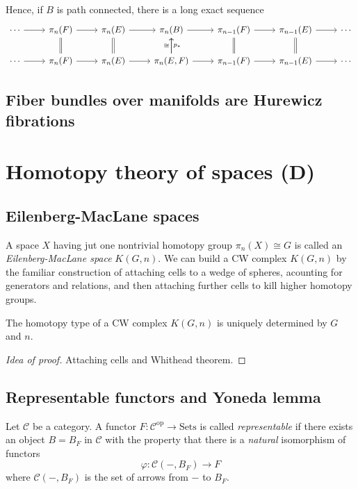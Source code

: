 \begin{definition}
\begin{theorem}[Hatcher 4.41]
	Hence, if $B$ is path connected, there is a long exact sequence
$$\begin{tikzcd}
	\cdots\arrow[r]&\pi_n(F)\arrow[r]&\pi_n(E)\arrow[r]&\pi_n(B)\arrow[r]&\pi_{n-1}(F)\arrow[r]&\pi_{n-1}(E)\arrow[r]&\cdots\\
	\cdots\arrow[r]&\pi_n(F)\arrow[r]\arrow[u,equals]&\pi_n(E)\arrow[r]\arrow[u,equals]&\pi_n(E,F)\arrow[r]\arrow[u,"\cong "]\arrow[u,swap,"p_{*}"]&\pi_{n-1}(F)\arrow[r]\arrow[u,equals]&\pi_{n-1}(E)\arrow[r]\arrow[u,equals]&\cdots
\end{tikzcd}$$
\end{theorem}

\subsection{Fiber bundles over manifolds are Hurewicz fibrations}

\section{Homotopy theory of spaces (D)}

\subsection{Eilenberg-MacLane spaces}
A space $X$ having jut one nontrivial homotopy group $\pi_{n}(X)\cong G$ is called an {\it Eilenberg-MacLane space} $K(G,n)$. We can build a CW complex $K(G,n)$ by the familiar construction of attaching cells to a wedge of spheres, acounting for generators and relations, and then attaching further cells to kill higher homotopy groups.

\begin{proposition}[4.30]
	The homotopy type of a CW complex $K(G,n)$ is uniquely determined by $G$ and $n$.
\end{proposition}
\begin{proof}[Idea of proof]
	Attaching cells and Whithead theorem.
\end{proof}

\subsection{Representable functors and Yoneda lemma}

\begin{definition}
	Let $\mathcal{C}$ be a category. A functor $F:\mathcal{C}^{\text{op}}\to \text{Sets}$ is called {\it representable} if there exists an object $B=B_{F}$ in $\mathcal{C}$ with the property that there is a \textit{natural} isomorphism of functors
	$$\varphi:\mathcal{C}(-,B_{F})\to F$$
	where $\mathcal{C}(-,B_{F})$ is the set of arrows from $-$ to $B_{F}$.


\end{definition}
\end{definition}
